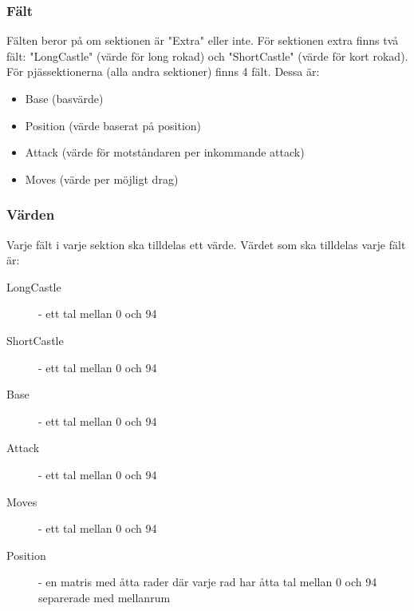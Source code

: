 \documentclass{article}
\begin{document}
	\subsubsection{Fält}
	Fälten beror på om sektionen är "Extra" eller inte.
	För sektionen extra finns två fält: "LongCastle" (värde för long rokad) och "ShortCastle" (värde för kort rokad). För pjässektionerna (alla andra sektioner) finns 4 fält. Dessa är:
\begin{itemize}
\item Base (basvärde)
\item Position (värde baserat på position)
\item Attack (värde för motståndaren per inkommande attack)
\item Moves (värde per möjligt drag)
\end{itemize}

\subsubsection{Värden}
Varje fält i varje sektion ska tilldelas ett värde. Värdet som ska tilldelas varje fält är:
\begin{description}
\item [LongCastle] - ett tal mellan 0 och 94
\item [ShortCastle] - ett tal mellan 0 och 94
\item [Base] - ett tal mellan 0 och 94
\item [Attack] - ett tal mellan 0 och 94 
\item [Moves] - ett tal mellan 0 och 94
\item [Position] - en matris med åtta rader där varje rad har åtta tal mellan 0 och 94 separerade med mellanrum
\end{description}
\end{document}
